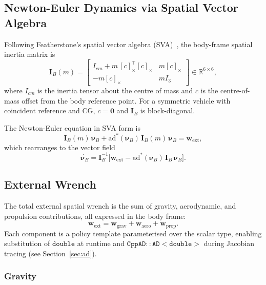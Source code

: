 \documentclass[a4paper,10pt]{article}
\newcommand{\ad}{\mathrm{ad}}
\newcommand{\R}{\mathbb{R}}
\newcommand{\nuB}{\boldsymbol{\nu}_B}
\newcommand{\IB}{\mathbf{I}_B}
\newcommand{\wext}{\mathbf{w}_{\mathrm{ext}}}
\theoremstyle{definition}
\begin{document}
\subsection{Newton-Euler Dynamics via Spatial Vector Algebra}

Following Featherstone's spatial vector algebra (SVA)~\citep{featherstone2008rbd},
the body-frame spatial inertia matrix is
\begin{equation}
  \IB(m) =
  \begin{bmatrix}
    I_{cm} + m\,[c]_\times^\top[c]_\times & m[c]_\times \\
    -m[c]_\times                            & mI_3
  \end{bmatrix}
  \in \R^{6\times6},
  \label{eq:spatial_inertia}
\end{equation}
where $I_{cm}$ is the inertia tensor about the centre of mass and $c$ is the
centre-of-mass offset from the body reference point.  For a symmetric vehicle
with coincident reference and CG, $c = \mathbf{0}$ and $\IB$ is block-diagonal.

The Newton-Euler equation in SVA form is
\begin{equation}
  \IB(m)\,\dot{\nuB} + \ad^*(\nuB)\,\IB(m)\,\nuB = \wext,
  \label{eq:newton_euler}
\end{equation}
which rearranges to the vector field
\begin{equation}
  \dot{\nuB} = \IB^{-1}\bigl[\wext - \ad^*(\nuB)\,\IB\,\nuB\bigr].
  \label{eq:nu_dot}
\end{equation}

\subsection{External Wrench}

The total external spatial wrench is the sum of gravity, aerodynamic, and
propulsion contributions, all expressed in the body frame:
\begin{equation}
  \wext = \mathbf{w}_{\mathrm{grav}} + \mathbf{w}_{\mathrm{aero}} + \mathbf{w}_{\mathrm{prop}}.
  \label{eq:wrench_total}
\end{equation}
Each component is a policy template parameterised over the scalar type,
enabling substitution of $\mathtt{double}$ at runtime and
$\mathtt{CppAD::AD<double>}$ during Jacobian tracing (see
Section~\ref{sec:ad}).

\subsubsection{Gravity}
\end{document}
